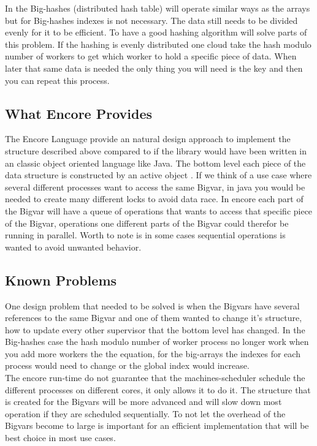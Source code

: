 In the Big-hashes (distributed hash table) will operate similar ways as the arrays but for Big-hashes indexes is not necessary. The data still needs to be divided evenly for it to be efficient. To have a good hashing algorithm will solve parts of this problem. If the hashing is evenly distributed one cloud take the hash modulo number of workers to get which worker to hold a specific piece of data. When later that same data is needed the only thing you will need is the key and then you can repeat this process. \\

\subsection{What Encore Provides}

The Encore Language provide an natural design approach to implement the structure described above compared to if the library would have been written in an classic object oriented language like Java. The bottom level each piece of the data structure is constructed by an active object \cite{background}. If we think of a use case where several different processes want to access the same Bigvar, in java you would be needed to create many different locks to avoid data race. In encore each part of the Bigvar will have a queue of operations that wants to access that specific piece of the Bigvar, operations one different parts of the Bigvar could therefor be running in parallel. Worth to note is in some cases sequential operations is wanted to avoid unwanted behavior.

\subsection{Known Problems}

One design problem that needed to be solved is when the Bigvars have several references to the same Bigvar and one of them wanted to change it’s structure, how to update every other  supervisor that the bottom level has changed. In the Big-hashes case the hash modulo number of worker process no longer work when you add more workers the the equation, for the big-arrays the indexes for each process would need to change or the global index would increase. \\

The encore run-time do not guarantee that the machines-scheduler schedule the different processes on different cores, it only allows it to do it. The structure that is created for the Bigvars will be more advanced and will slow down most operation if they are scheduled sequentially. To not let the overhead of the Bigvars become to large is important for an efficient implementation that will be best choice in most use cases. \\



